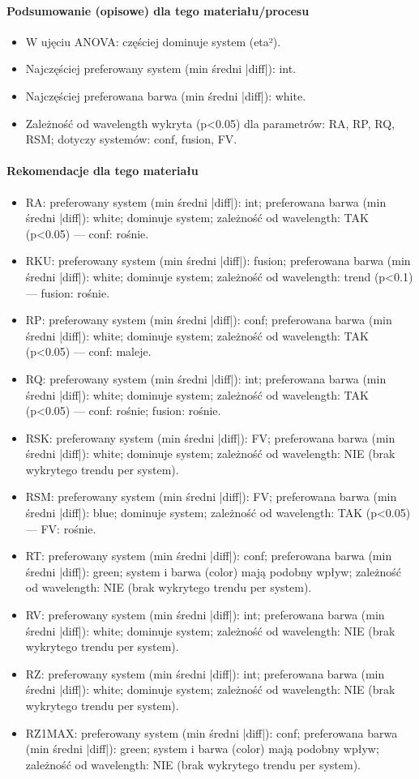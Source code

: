 \documentclass[
  10pt,
]{article}
\begin{document}
\paragraph{Podsumowanie (opisowe) dla tego materiału/procesu}
\begin{itemize}
\item W ujęciu ANOVA: częściej dominuje system (eta²).
\item Najczęściej preferowany system (min średni |diff|): int.
\item Najczęściej preferowana barwa (min średni |diff|): white.
\item Zależność od wavelength wykryta (p<0.05) dla parametrów: RA, RP, RQ, RSM; dotyczy systemów: conf, fusion, FV.
\end{itemize}
\paragraph{Rekomendacje dla tego materiału}
\begin{itemize}
\item RA: preferowany system (min średni |diff|): int; preferowana barwa (min średni |diff|): white; dominuje system; zależność od wavelength: TAK (p<0.05) — conf: rośnie.
\item RKU: preferowany system (min średni |diff|): fusion; preferowana barwa (min średni |diff|): white; dominuje system; zależność od wavelength: trend (p<0.1) — fusion: rośnie.
\item RP: preferowany system (min średni |diff|): conf; preferowana barwa (min średni |diff|): white; dominuje system; zależność od wavelength: TAK (p<0.05) — conf: maleje.
\item RQ: preferowany system (min średni |diff|): int; preferowana barwa (min średni |diff|): white; dominuje system; zależność od wavelength: TAK (p<0.05) — conf: rośnie; fusion: rośnie.
\item RSK: preferowany system (min średni |diff|): FV; preferowana barwa (min średni |diff|): white; dominuje system; zależność od wavelength: NIE (brak wykrytego trendu per system).
\item RSM: preferowany system (min średni |diff|): FV; preferowana barwa (min średni |diff|): blue; dominuje system; zależność od wavelength: TAK (p<0.05) — FV: rośnie.
\item RT: preferowany system (min średni |diff|): conf; preferowana barwa (min średni |diff|): green; system i barwa (color) mają podobny wpływ; zależność od wavelength: NIE (brak wykrytego trendu per system).
\item RV: preferowany system (min średni |diff|): int; preferowana barwa (min średni |diff|): white; dominuje system; zależność od wavelength: NIE (brak wykrytego trendu per system).
\item RZ: preferowany system (min średni |diff|): int; preferowana barwa (min średni |diff|): white; dominuje system; zależność od wavelength: NIE (brak wykrytego trendu per system).
\item RZ1MAX: preferowany system (min średni |diff|): conf; preferowana barwa (min średni |diff|): green; system i barwa (color) mają podobny wpływ; zależność od wavelength: NIE (brak wykrytego trendu per system).
\end{itemize}
\end{document}
